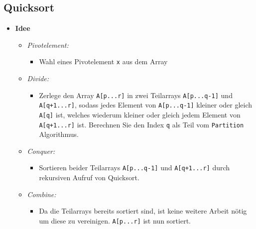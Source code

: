 \subsection{Quicksort}
    \begin{itemize}
        \item \textbf{Idee}
            \begin{itemize}
                \item \textit{Pivotelement:}
                    \begin{itemize}
                        \item[]
                            Wahl eines Pivotelement \texttt{x} aus dem Array
                    \end{itemize}

                \item \textit{Divide:}
                    \begin{itemize}
                        \item[]
                            Zerlege den Array \texttt{A[p...r]} in zwei Teilarrays \texttt{A[p...q-1]} und \texttt{A[q+1...r]},
                            sodass jedes Element von \texttt{A[p...q-1]} kleiner oder gleich \texttt{A[q]} ist, welches
                            wiederum kleiner oder gleich jedem Element von \texttt{A[q+1...r]} ist. Berechnen Sie den Index \texttt{q}
                            als Teil vom \texttt{Partition} Algorithmus.
                    \end{itemize}

                \item \textit{Conquer:}
                    \begin{itemize}
                        \item[]
                            Sortieren beider Teilarrays \texttt{A[p...q-1]} und \texttt{A[q+1...r]} durch rekursiven Aufruf von
                            Quicksort.
                    \end{itemize}
                
                \item \textit{Combine:}
                    \begin{itemize}
                        \item[]
                            Da die Teilarrays bereits sortiert sind, ist keine weitere Arbeit nötig um diese zu vereinigen.
                            \texttt{A[p...r]} ist nun sortiert.
                    \end{itemize}
            \end{itemize}


\end{itemize}

